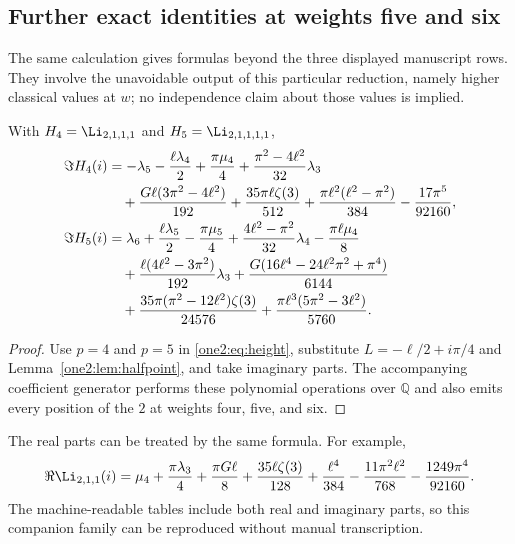 \subsection{Further exact identities at weights five and six}

The same calculation gives formulas beyond the three displayed
manuscript rows.  They involve the unavoidable output of this
particular reduction, namely higher classical values at $w$; no
independence claim about those values is implied.

\begin{corollary}
\label{one2:cor:56}
With $H_4=\Li_{2,1,1,1}$ and $H_5=\Li_{2,1,1,1,1}$,
\begin{align}
 \Im H_4(i)
 &=-\lambda_5-\frac{\ell\lambda_4}{2}+\frac{\pi\mu_4}{4}
       +\frac{\pi^2-4\ell^2}{32}\lambda_3\notag\\
 &\quad+\frac{G\ell(3\pi^2-4\ell^2)}{192}
       +\frac{35\pi\ell\zeta(3)}{512}
       +\frac{\pi\ell^2(\ell^2-\pi^2)}{384}
       -\frac{17\pi^5}{92160},
       \label{one2:eq:H4}\\
 \Im H_5(i)
 &=\lambda_6+\frac{\ell\lambda_5}{2}-\frac{\pi\mu_5}{4}
       +\frac{4\ell^2-\pi^2}{32}\lambda_4
       -\frac{\pi\ell\mu_4}{8}\notag\\
 &\quad+\frac{\ell(4\ell^2-3\pi^2)}{192}\lambda_3
       +\frac{G(16\ell^4-24\ell^2\pi^2+\pi^4)}{6144}\notag\\
 &\quad+\frac{35\pi(\pi^2-12\ell^2)\zeta(3)}{24576}
       +\frac{\pi\ell^3(5\pi^2-3\ell^2)}{5760}.
       \label{one2:eq:H5}
\end{align}
\end{corollary}
\begin{proof}
Use $p=4$ and $p=5$ in \eqref{one2:eq:height}, substitute
$L=-\ell/2+i\pi/4$ and Lemma~\ref{one2:lem:halfpoint}, and take
imaginary parts.  The accompanying coefficient generator performs
these polynomial operations over $\mathbb Q$ and also emits every
position of the $2$ at weights four, five, and six.
\end{proof}

The real parts can be treated by the same formula.  For example,
\begin{equation}
 \Re\Li_{2,1,1}(i)=\mu_4+\frac{\pi\lambda_3}{4}
 +\frac{\pi G\ell}{8}+\frac{35\ell\zeta(3)}{128}
 +\frac{\ell^4}{384}-\frac{11\pi^2\ell^2}{768}
 -\frac{1249\pi^4}{92160}.
 \label{one2:eq:real211}
\end{equation}
The machine-readable tables include both real and imaginary parts,
so this companion family can be reproduced without manual
transcription.

